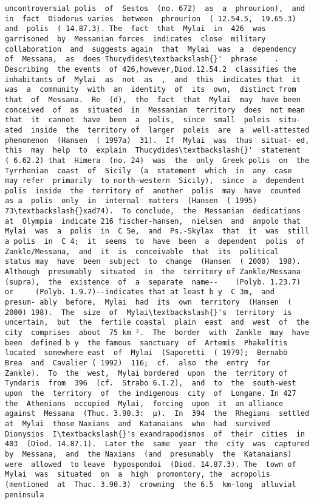 \documentclass[11pt]{article}
\begin{document}
\begin{Verbatim}[commandchars=\\\{\}]
uncontroversial polis  of  Sestos  (no. 672)  as  a  phrourion),  and  in  fact  Diodorus varies  between  phrourion  ( 12.54.5,  19.65.3)  and  polis  ( 14.87.3). The  fact  that  Mylai  in  426  was  garrisoned  by  Messanian forces  indicates  close  military  collaboration  and  suggests again  that  Mylai  was  a  dependency  of  Messana,  as  does Thucydides\textbackslash{}'  phrase    .  Describing  the events  of 426,however,Diod.12.54.2  classifies the inhabitants of  Mylai  as  not  as  ,  and  this  indicates that  it  was  a  community  with  an  identity  of  its  own,  distinct from  that  of  Messana.  Re  (d),  the  fact  that  Mylai  may  have been  conceived  of  as  situated  in  Messanian  territory  does  not mean  that  it  cannot  have  been  a  polis,  since  small  poleis  situ- ated  inside  the  territory of  larger  poleis  are  a  well-attested phenomenon  (Hansen  ( 1997a)  31).  If  Mylai  was  thus  situat- ed,  this  may  help  to  explain  Thucydides\textbackslash{}'  statement  ( 6.62.2) that  Himera  (no. 24)  was  the  only  Greek polis  on  the Tyrrhenian  coast  of  Sicily  (a  statement  which  in  any  case  may refer  primarily  to north-western  Sicily),  since  a  dependent polis  inside  the  territory of  another  polis  may  have  counted  as a  polis  only  in  internal  matters  (Hansen  ( 1995)  73\textbackslash{}xad74).  To conclude,  the  Messanian  dedications  at  Olympia  indicate 216 fischer-hansen,  nielsen  and  ampolo that  Mylai  was  a  polis  in  C 5e,  and  Ps.-Skylax  that  it  was  still  a polis  in  C 4;  it  seems  to  have  been  a  dependent  polis  of Zankle/Messana,  and  it  is  conceivable  that  its  political  status may  have  been  subject  to  change  (Hansen  ( 2000)  198). Although  presumably  situated  in  the  territory of Zankle/Messana  (supra),  the  existence  of  a  separate  name--    (Polyb. 1.23.7)  or     (Polyb. 1.9.7)--indicates that at least b y  C 3m,  and  presum- ably  before,  Mylai  had  its  own  territory  (Hansen  ( 2000) 198).  The  size  of  Mylai\textbackslash{}'s  territory  is  uncertain,  but  the  fertile coastal  plain  east  and  west  of  the  city  comprises  about  75 km ².  The  border  with  Zankle  may  have  been  defined b y  the famous  sanctuary  of  Artemis  Phakelitis  located  somewhere east  of  Mylai  (Saporetti  ( 1979);  Bernabò  Brea  and  Cavalier ( 1992)  116;  cf.  also  the  entry  for  Zankle).  To  the  west,  Mylai bordered  upon  the  territory of  Tyndaris  from  396  (cf.  Strabo 6.1.2),  and  to  the  south-west  upon  the  territory  of  the indigenous  city  of  Longane. In 427  the  Athenians  occupied  Mylai,  forcing  upon  it  an alliance  against  Messana  (Thuc. 3.90.3:  µ).  In  394  the  Rhegians  settled  at  Mylai  those Naxians  and  Katanaians  who  had  survived  Dionysios  I\textbackslash{}'s exandrapodismos  of  their  cities  in  403  (Diod. 14.87.1).  Later the  same  year  the  city  was  captured  by  Messana,  and  the Naxians  (and  presumably  the  Katanaians)  were  allowed  to leave  hypospondoi  (Diod. 14.87.3). The  town of  Mylai  was  situated  on  a  high  promontory, the  acropolis  (mentioned  at  Thuc. 3.90.3)  crowning  the 6.5  km-long  alluvial  peninsula  
\end{Verbatim}
\end{document}
